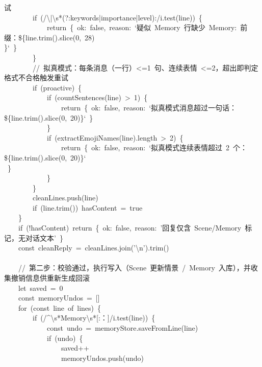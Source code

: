 \documentclass[a4paper,10pt]{article}
\begin{document}
{\ttfamily\footnotesize\raggedright
试\\
~~~~~~~~if~(/\textbackslash{}|\textbackslash{}s*(?:keywords|importance|level):/i.test(line))~\{\\
~~~~~~~~~~~~return~\{~ok:~false,~reason:~`疑似~Memory~行缺少~Memory:~前缀：\$\{line.trim().slice(0,~28)\\
\}`~\}\\
~~~~~~~~\}\\
~~~~~~~~//~拟真模式：每条消息（一行）<=1~句、连续表情~<=2，超出即判定格式不合格触发重试\\
~~~~~~~~if~(proactive)~\{\\
~~~~~~~~~~~~if~(countSentences(line)~>~1)~\{\\
~~~~~~~~~~~~~~~~return~\{~ok:~false,~reason:~`拟真模式消息超过一句话：\$\{line.trim().slice(0,~20)\}`~\}\\
~~~~~~~~~~~~\}\\
~~~~~~~~~~~~if~(extractEmojiNames(line).length~>~2)~\{\\
~~~~~~~~~~~~~~~~return~\{~ok:~false,~reason:~`拟真模式连续表情超过~2~个：\$\{line.trim().slice(0,~20)\}`\\
~\}\\
~~~~~~~~~~~~\}\\
~~~~~~~~\}\\
~~~~~~~~cleanLines.push(line)\\
~~~~~~~~if~(line.trim())~hasContent~=~true\\
~~~~\}\\
~~~~if~(!hasContent)~return~\{~ok:~false,~reason:~'回复仅含~Scene/Memory~标记，无对话文本'~\}\\
~~~~const~cleanReply~=~cleanLines.join('\textbackslash{}n').trim()\\
\mbox{}\\
~~~~//~第二步：校验通过，执行写入（Scene~更新情景~/~Memory~入库），并收集撤销信息供重新生成回滚\\
~~~~let~saved~=~0\\
~~~~const~memoryUndos~=~[]\\
~~~~for~(const~line~of~lines)~\{\\
~~~~~~~~if~(/\textasciicircum{}\textbackslash{}s*Memory\textbackslash{}s*[:：]/i.test(line))~\{\\
~~~~~~~~~~~~const~undo~=~memoryStore.saveFromLine(line)\\
~~~~~~~~~~~~if~(undo)~\{\\
~~~~~~~~~~~~~~~~saved++\\
~~~~~~~~~~~~~~~~memoryUndos.push(undo)\\
}
\end{document}
